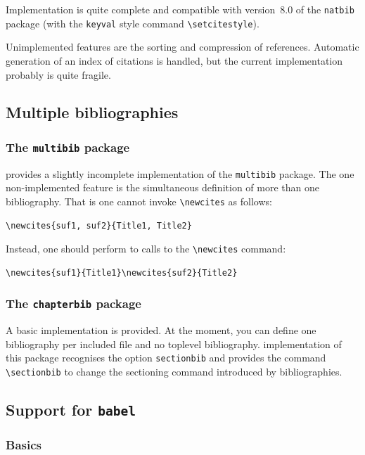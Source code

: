 Implementation is quite complete and compatible
with version~8.0 of the \texttt{natbib} package
(with the \texttt{keyval} style command \verb+\setcitestyle+).

Unimplemented features are the sorting and compression of references.
Automatic generation of an index of citations is handled, but
the current implementation probably is quite fragile.

\subsection{Multiple bibliographies}

\subsubsection*{The \texttt{multibib} package}
\hevea{} provides a slightly incomplete implementation of the
\texttt{multibib} package. The one non-implemented feature is the
simultaneous definition of more than one bibliography.
That is one cannot invoke \verb+\newcites+ as follows:
\begin{verbatim}
\newcites{suf1, suf2}{Title1, Title2}
\end{verbatim}
Instead, one should perform to calls to the \verb+\newcites+ command:
\begin{verbatim}
\newcites{suf1}{Title1}\newcites{suf2}{Title2}
\end{verbatim}


\subsubsection*{The \texttt{chapterbib} package}
A basic implementation is provided. At the moment, you can
define one bibliography per included file and no toplevel
bibliography.
\hevea{} implementation of this package recognises the option
\verb+sectionbib+ and provides the command \verb+\sectionbib+
to change the sectioning command introduced by bibliographies.


\subsection{Support for \texttt{babel}}
\subsubsection{Basics\label{sec:babel-basics}}

